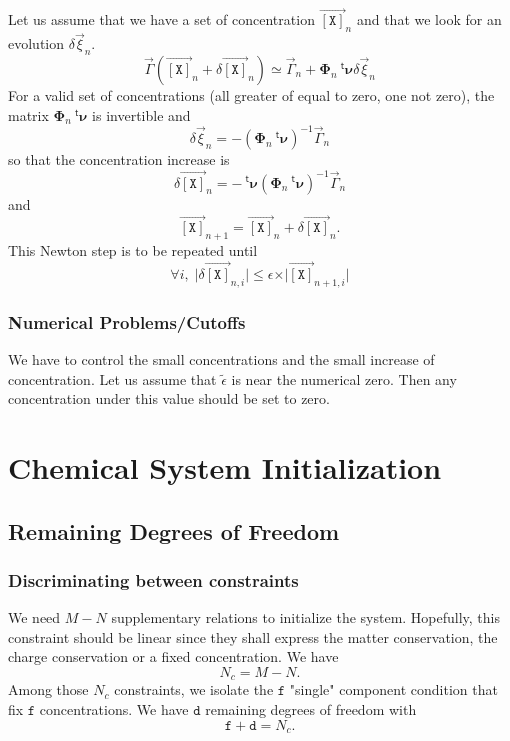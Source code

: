 \documentclass[aps,twocolumn]{revtex4}
\newcommand{\myconc}[1]{\left\lbrack #1 \right\rbrack}
\newcommand{\mychem}[1]{{\mathtt{#1}}}
\newcommand{\mymat}[1]{\boldsymbol{#1}}
\newcommand{\mytrn}[1]{{\!\!~^{\mathsf{t}}{#1}}}
\newcommand{\myvec}[1]{\overrightarrow{#1}}
\newcommand{\vecX}{\myvec{\myconc{\mychem{X}}}}
\newcommand{\dof}{\mathtt{d}}
\newcommand{\fixed}{\mathtt{f}}
\begin{document}
Let us assume that we have a set of concentration $\vecX_{n}$ and that we look for an evolution $\delta\vec{\xi}_{n}$.
\begin{equation}
	\vec{\Gamma}\left(\vecX_{n}+\delta\vecX_{n}\right) \simeq \vec{\Gamma}_{n} + \mymat{\Phi}_n \mytrn{\mymat{\nu}} \delta\vec{\xi}_n
\end{equation}
For a valid set of concentrations (all greater of equal to zero, one not zero), the matrix $\mymat{\Phi}_n \mytrn{\mymat{\nu}}$ is invertible
and
\begin{equation}
	\delta\vec{\xi}_n = -\left(\mymat{\Phi}_n \mytrn{\mymat{\nu}}\right)^{-1} \vec{\Gamma}_{n}
\end{equation}
so that the concentration increase is
\begin{equation}
	\delta\vecX_{n} = - \mytrn{\mymat{\nu}}\left(\mymat{\Phi}_n \mytrn{\mymat{\nu}}\right)^{-1} \vec{\Gamma}_{n}
\end{equation}
and
\begin{equation}
	\vecX_{n+1} = \vecX_{n} + \delta\vecX_{n}.
\end{equation}
This Newton step is to be repeated until
\begin{equation}
	\forall i, \; \vert\delta\vecX_{n,i}\vert \leq \epsilon \times \vert\vecX_{n+1,i}\vert
\end{equation}

\subsubsection{Numerical Problems/Cutoffs}
We have to control the small concentrations and the small increase of concentration.
Let us assume that $\tilde\epsilon$ is near the numerical zero. Then any concentration under this value
should be set to zero. 


\section{Chemical System Initialization}
\subsection{Remaining Degrees of Freedom}
\subsubsection{Discriminating between constraints}
We need $M-N$ supplementary relations to initialize the system. Hopefully, this constraint should be linear
since they shall express the matter conservation, the charge conservation or a fixed concentration.
We have
$$
	N_c  = M-N.
$$
Among those $N_c$ constraints, we isolate the $\fixed$ "single" component condition that fix $\fixed$ concentrations.
We have $\dof$ remaining degrees of freedom with
$$
	\fixed + \dof = N_c.
$$
\end{document}

